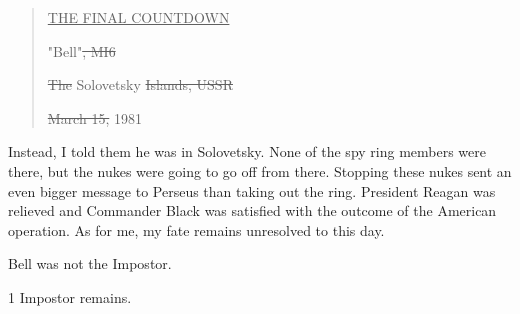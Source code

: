 \documentclass{article}
\begin{document}
\begin{quote}
    \underline{THE FINAL COUNTDOWN}
    
    "Bell"\sout{, MI6}
    
    \sout{The} Solovetsky \sout{Islands, USSR}
    
    \sout{March 15,} 1981
\end{quote}

Instead, I told them he was in Solovetsky. None of the spy ring members were there, but the nukes were going to go off from there. Stopping these nukes sent an even bigger message to Perseus than taking out the ring. President Reagan was relieved and Commander Black was satisfied with the outcome of the American operation. As for me, my fate remains unresolved to this day.

\begin{center}
    Bell was not the Impostor.
    
    1 Impostor remains.
\end{center}
\end{document}
